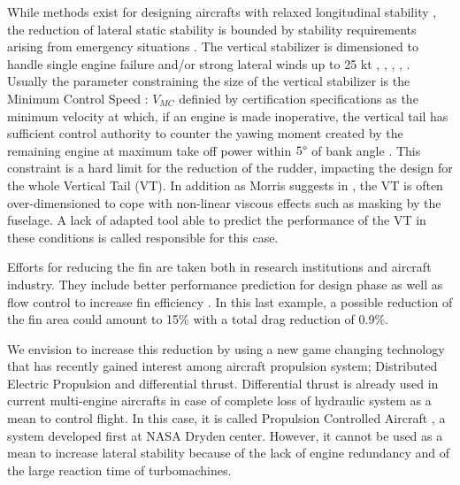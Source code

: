 While methods exist for designing aircrafts with relaxed longitudinal stability \cite{CosenzaHandlingQualities}, the reduction of lateral static stability is bounded by stability requirements arising from emergency situations . The vertical stabilizer is dimensioned to handle single engine failure and/or strong lateral winds up to 25 kt \cite{FeuersangerReducedStability}, \cite{AFC_NASA_report_Mooney}, \cite{NicolosiInvestigationVertical}, \cite{CS25}, \cite{MorrisFlDynCstinMDO}. Usually the parameter constraining the size of the vertical stabilizer is the Minimum Control Speed : $V_{MC}$ definied by certification specifications as the minimum velocity at which, if an engine is made inoperative, the vertical tail has sufficient control authority to counter the yawing moment created by the remaining engine at maximum take off power within $5\SIUnitSymbolDegree$ of bank angle \cite{CS25}. This constraint is a hard limit for the reduction of the rudder, impacting the design for the whole Vertical Tail (VT). In addition as Morris suggests in \cite{MorrisFlDynCstinMDO}, the VT is often over-dimensioned to cope with non-linear viscous effects such as masking by the fuselage. A lack of adapted tool able to predict the performance of the VT in these conditions is called responsible for this case.

Efforts for reducing the fin are taken both in research institutions and aircraft industry. They include better performance prediction for design phase \cite{dellavecchia} as well as flow control to increase fin efficiency \cite{InnovativeFlow_Lin}. In this last example, a possible reduction of the fin area could amount to 15\% with a total drag reduction of 0.9\%.

We envision to increase this reduction by using a new game changing technology that has recently gained interest among aircraft propulsion system; Distributed Electric Propulsion and differential thrust. Differential thrust is already used in current multi-engine aircrafts in case of complete loss of hydraulic system as a mean to control flight. In this case, it is called Propulsion Controlled Aircraft \cite{TouchdownPCA}, a system developed first at NASA Dryden center. However, it cannot be used as a mean to increase lateral stability because of the lack of engine redundancy and of the large reaction time of turbomachines.

